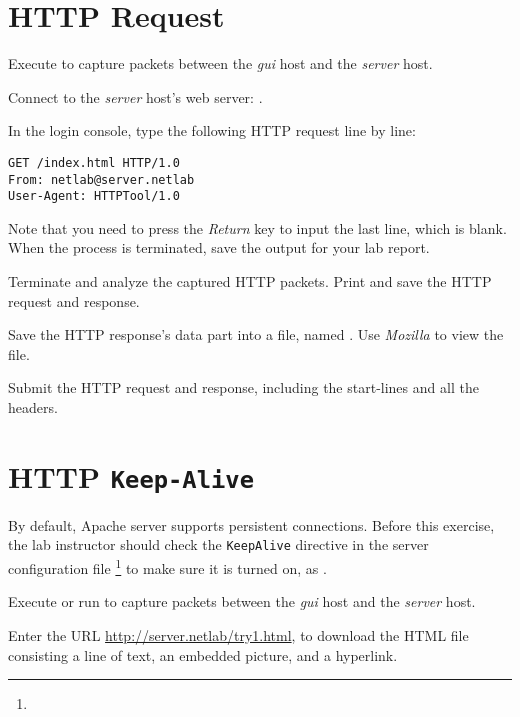 \documentclass{../UTNetLab}
\begin{document}
\section{HTTP Request}
Execute  to capture packets between the \textit{gui} host and the \textit{server} host.

Connect to the \textit{server} host’s web server: .

In the login console, type the following HTTP request line by line:
\begin{lstlisting}[language={HTTP},morekeywords={[2]GET,From,User-Agent},escapechar={},emph={server,netlab}]
GET /index.html HTTP/1.0
From: netlab@server.netlab
User-Agent: HTTPTool/1.0

    \end{lstlisting}
Note that you need to press the \textit{Return} key to input the last line, which is blank.
When the  process is terminated, save the output for your lab report.

Terminate  and analyze the captured HTTP packets.
Print and save the HTTP request and response.

Save the HTTP response’s data part into a file, named .
Use \textit{Mozilla} to view the file.

\begin{report}
    \item Submit the HTTP request and response, including the start-lines and all the headers.
\end{report}


\section{HTTP \texttt{Keep-Alive}}
By default, Apache server supports persistent connections.
Before this exercise, the lab instructor should check the \texttt{KeepAlive} directive in the server configuration file \footnote{} to make sure it is turned on, as .

Execute  or run  to capture packets between the \textit{gui} host and the \textit{server} host.


Enter the URL \url{http://server.netlab/try1.html}, to download the HTML file consisting a line of text, an embedded picture, and a hyperlink.
\end{document}
